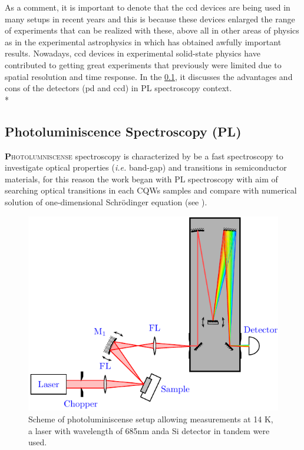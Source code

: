 As a comment, it is important to denote that the \gls{ccd} devices are being used in many setups in recent years and this is because these devices enlarged the range of experiments that can be realized with these, above all in other areas of physics as in the experimental astrophysics in which has obtained awfully important results.  Nowadays, \gls{ccd} devices in experimental solid-state physics have contributed to getting great experiments that previously were limited due to spatial resolution and time response.  In the \cref{subsec:chapter-3-pl}, it discusses the advantages and cons of the detectors (\gls{pd} and \gls{ccd})  in PL spectroscopy context. \\*

\subsection{Photoluminiscence Spectroscopy (PL)}
\label{subsec:chapter-3-pl}
\vspace{-10mm}
\lettrine[lines=3, lraise=.1, nindent=0mm, slope=0mm]{\textbf{P}}{hotolumniscense} spectroscopy is characterized by be a fast spectroscopy to investigate optical properties (\textit{i.e.} band-gap) and transitions in  semiconductor materials, for this reason the work began with PL spectroscopy with aim of searching optical transitions in each CQWs samples and compare with  numerical solution of one-dimensional Schr\"{o}dinger equation (see ). 
\begin{figure}[hbtp!]
	\centering
	\includegraphics[width=\textwidth]{../figures/chapter-3/pl-setup/build-ruco/pl-setup}
	\caption[PL Scheme]{Scheme of photoluminiscense setup allowing measurements at 14 K, a laser with wavelength of 685nm anda Si detector in tandem were used.}
	\label{fig:chapter-3 subsec 3.2.1 PL setup}
\end{figure}

